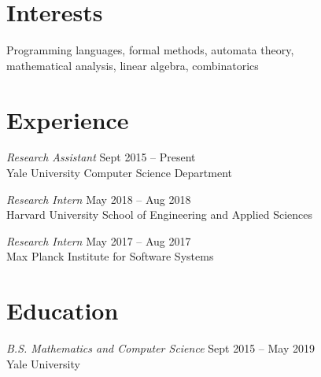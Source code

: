 \documentclass[margin]{res}
\begin{document}
 

 
\address{\textbf{Address} \\
         17 Broadway 2L \\
         New Haven, CT 06511}
 
\address{\textbf{Contact} \\
         \href{antonxue.github.io}{\texttt{antonxue.github.io}} \\
         \texttt{anton.xue@yale.edu}}

\begin{resume} 
 
\section{Interests} 
Programming languages, formal methods, automata theory, \\
mathematical analysis, linear algebra, combinatorics


\section{Experience}
\textit{Research Assistant} \hfill Sept 2015 -- Present \\
Yale University Computer Science Department

\textit{Research Intern} \hfill May 2018 -- Aug 2018 \\
Harvard University School of Engineering and Applied Sciences

\textit{Research Intern} \hfill May 2017 -- Aug 2017 \\
Max Planck Institute for Software Systems

\section{Education} 
\textit{B.S. Mathematics and Computer Science}
  \hfill Sept 2015 -- May 2019 \\
Yale University




\end{resume}
\end{document}
